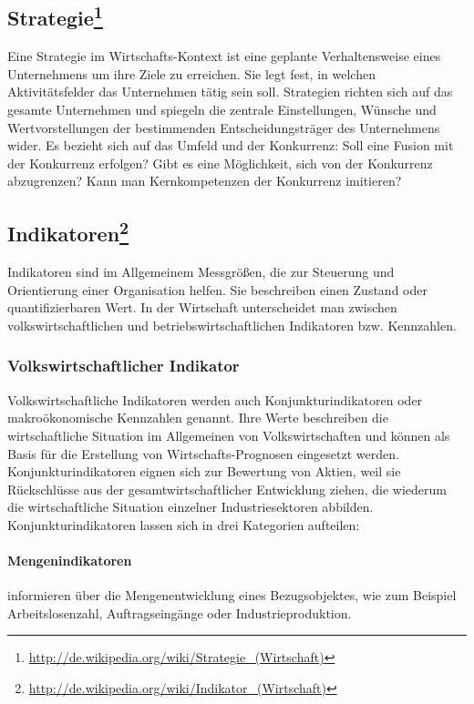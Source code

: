 \subsection[Strategie]{Strategie\footnote{\url{ http://de.wikipedia.org/wiki/Strategie_(Wirtschaft)}}}
Eine Strategie im Wirtschafts-Kontext ist eine geplante Verhaltensweise eines Unternehmens um ihre Ziele zu erreichen. Sie legt fest, in welchen Aktivitätsfelder das Unternehmen tätig sein soll. Strategien richten sich auf das gesamte Unternehmen und spiegeln die zentrale Einstellungen, Wünsche und Wertvorstellungen der bestimmenden Entscheidungsträger des Unternehmens wider. Es bezieht sich auf das Umfeld und der Konkurrenz: Soll eine Fusion mit der Konkurrenz erfolgen? Gibt es eine Möglichkeit, sich von der Konkurrenz abzugrenzen? Kann man Kernkompetenzen der Konkurrenz imitieren? 



\subsection[Indikatoren]{Indikatoren\footnote{\url{ http://de.wikipedia.org/wiki/Indikator_(Wirtschaft)}}}

Indikatoren sind im Allgemeinem Messgrößen, die zur Steuerung und Orientierung einer Organisation helfen. Sie beschreiben einen Zustand oder quantifizierbaren Wert. In der Wirtschaft unterscheidet man zwischen volks\-wirtschaftlichen und betriebswirtschaftlichen Indikatoren bzw. Kennzahlen.

\subsubsection{Volkswirtschaftlicher Indikator}

Volkswirtschaftliche Indikatoren werden auch Konjunkturindikatoren oder makroökonomische Kennzahlen genannt. Ihre Werte beschreiben die wirt\-schaft\-liche Situation im Allgemeinen von Volkswirtschaften und können als Basis für die Erstellung von Wirtschafts-Prognosen eingesetzt werden. 
\\
Konjunkturindikatoren eignen sich zur Bewertung von Aktien, weil sie Rück\-schlüsse aus der gesamtwirtschaftlicher Entwicklung ziehen, die wiederum die wirtschaftliche Situation einzelner Industriesektoren abbilden. Konjunkturindikatoren lassen sich in drei Kategorien aufteilen:

\paragraph{Mengenindikatoren} informieren über die Mengenentwicklung eines Bezugsobjektes, wie zum Beispiel Arbeitslosenzahl, Auftragseingänge oder Industrieproduktion.
